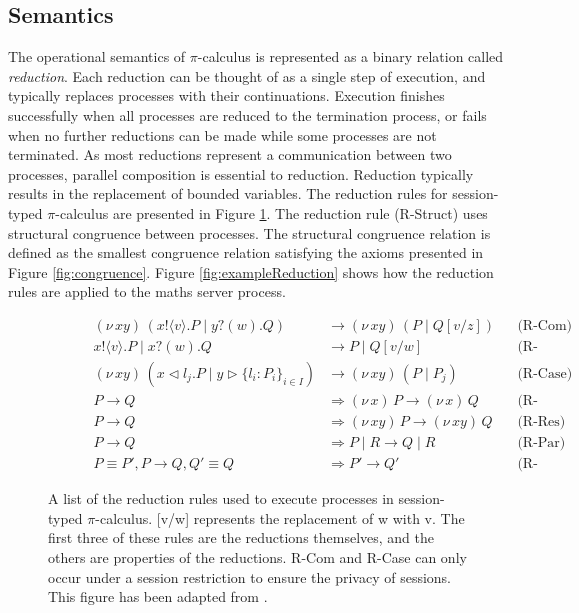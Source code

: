 \documentclass{l4proj}
\begin{document}
\subsection{Semantics}
\label{bgSesSem}

\quad The operational semantics of $\pi$-calculus is represented as a binary relation called \emph{reduction}. Each reduction can be thought of as a single step of execution, and typically replaces processes with their continuations. Execution finishes successfully when all processes are reduced to the termination process, or fails when no further reductions can be made while some processes are not terminated. As most reductions represent a communication between two processes, parallel composition is essential to reduction. Reduction typically results in the replacement of bounded variables. The reduction rules for session-typed $\pi$-calculus are presented in Figure \ref{fig:sesProcReduc}. The reduction rule (R-Struct) uses structural congruence between processes. The structural congruence relation is defined as the smallest congruence relation satisfying the axioms presented in Figure \ref{fig:congruence}. Figure \ref{fig:exampleReduction} shows how the reduction rules are applied to the maths server process.

\begin{figure}[H]
\centering
\begin{subfigure}{\textwidth}
\begin{align*}
(\nu\,xy)\,(x\texttt{!} \langle v \rangle .P \mid y\texttt{?}(w).Q) &\rightarrow (\nu\,xy)\,(P \mid Q[v/z]) & &\text{(R-Com)}\\
x\texttt{!} \langle v \rangle .P \mid x\texttt{?}(w).Q &\rightarrow P \mid Q[v/w] & &\text{(R-StndCom)}\\
(\nu\,xy)\,(x \triangleleft l_{j}.P \mid y \triangleright\{l_{i}:P_{i}\}_{i \in I}) &\rightarrow (\nu\,xy)\,(P \mid P_{j}) & &\text{(R-Case)}\\
P \rightarrow Q &\Longrightarrow (\nu\,x)\,P \rightarrow (\nu\,x)\,Q & &\text{(R-StndRes)}\\
P \rightarrow Q &\Longrightarrow (\nu\,xy)\,P \rightarrow (\nu\,xy)\,Q & &\text{(R-Res)}\\
P \rightarrow Q &\Longrightarrow P \mid R \rightarrow Q \mid R & &\text{(R-Par)}\\
P \equiv P', P \rightarrow Q, Q' \equiv Q &\Longrightarrow P' \rightarrow Q' & &\text{(R-Struct)}
\end{align*}
\end{subfigure}
\caption{A list of the reduction rules used to execute processes in session-typed $\pi$-calculus.  [v/w] represents the replacement of w with v. The first three of these rules are the reductions themselves, and the others are properties of the reductions. R-Com and R-Case can only occur under a session restriction to ensure the privacy of sessions. This figure has been adapted from \citet{DARDHA2017253}.}
\label{fig:sesProcReduc}
\end{figure}
\end{document}
